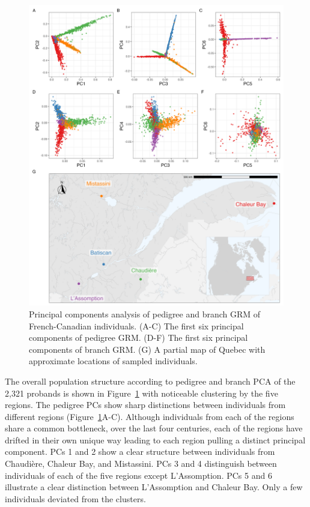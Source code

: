 \begin{figure}
    \centering
    \includegraphics[width = \textwidth]{Figures/map_and_pca_grid4.jpg}
    \caption{Principal components analysis of pedigree and branch GRM of French-Canadian individuals.
    (A-C) The first six principal components of pedigree GRM.
    (D-F) The first six principal components of branch GRM.
    (G) A partial map of Quebec with approximate locations of sampled individuals. \label{fig:PCA_map}}
\end{figure}

The overall population structure according to pedigree and branch PCA
of the 2,321 probands is shown in Figure~\ref{fig:PCA_map}
with noticeable clustering by the five regions.
%
The pedigree PCs show sharp distinctions between individuals from different regions
(Figure~\ref{fig:PCA_map}A-C).
%
Although individuals from each of the regions share a common bottleneck,
over the last four centuries,
each of the regions have drifted in their own unique way
leading to each region pulling a distinct principal component.
%
PCs 1 and 2 show a clear structure between individuals from Chaudière, Chaleur Bay, and Mistassini.
%
PCs 3 and 4 distinguish between individuals of each of the five regions except L'Assomption.
%
PCs 5 and 6 illustrate a clear distinction between L'Assomption and Chaleur Bay.
%
Only a few individuals deviated from the clusters.

